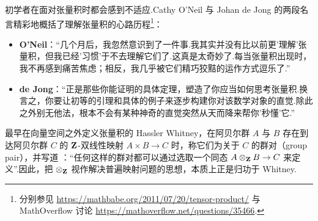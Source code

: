 \begin{enumerate}
  初学者在面对张量积时都会感到不适应.Cathy O'Neil 与 Johan de Jong 的两段名言精彩地概括了理解张量积的心路历程\footnote{分别参见 \url{https://mathbabe.org/2011/07/20/tensor-product/} 与 MathOverflow 讨论 \url{https://mathoverflow.net/questions/35466}.}：
  \begin{itemize}
    \item \textbf{O'Neil}：``几个月后，我忽然意识到了一件事.我其实并没有比以前更'理解'张量积，但我已经'习惯'于不去理解它们了.这真是太奇妙了.每当张量积出现时，我不再感到痛苦焦虑；相反，我几乎被它们精巧狡黠的运作方式逗乐了.''
    \item \textbf{de Jong}：``正是那些你能证明的具体定理，塑造了你应当如何思考张量积.换言之，你要让初等的引理和具体的例子来逐步构建你对该数学对象的直觉.除此之外别无他法，根本不会有某种神奇的直觉突然从天而降来帮你'秒懂'它.''
  \end{itemize}
\end{enumerate}

\begin{remark}\label{rem:whitney}
最早在向量空间之外定义张量积的 Hassler Whitney，在阿贝尔群 $A$ 与 $B$ 存在到达阿贝尔群 $C$ 的 $\mathbf{Z}$-双线性映射 $A \times B \to C$ 时，称它们为关于 $C$ 的群对（group pair），并写道 \cite[第~499~页]{whitney}：``任何这样的群对都可以通过选取一个同态 $A \otimes_{\mathbf{Z}} B \to C$ 来定义''.因此，把 $\otimes_{\mathbf{Z}}$ 视作解决普遍映射问题的思想，本质上正是归功于 Whitney.
\end{remark}
